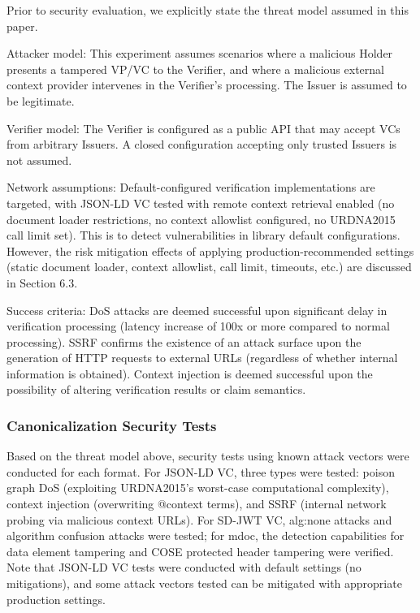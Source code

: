 \documentclass[conference]{IEEEtran}
\begin{document}
Prior to security evaluation, we explicitly state the threat model assumed in this paper.

Attacker model: This experiment assumes scenarios where a malicious Holder presents a tampered VP/VC to the Verifier, and where a malicious external context provider intervenes in the Verifier's processing. The Issuer is assumed to be legitimate.

Verifier model: The Verifier is configured as a public API that may accept VCs from arbitrary Issuers. A closed configuration accepting only trusted Issuers is not assumed.

Network assumptions: Default-configured verification implementations are targeted, with JSON-LD VC tested with remote context retrieval enabled (no document loader restrictions, no context allowlist configured, no URDNA2015 call limit set). This is to detect vulnerabilities in library default configurations. However, the risk mitigation effects of applying production-recommended settings (static document loader, context allowlist, call limit, timeouts, etc.) are discussed in Section 6.3.

Success criteria: DoS attacks are deemed successful upon significant delay in verification processing (latency increase of 100x or more compared to normal processing). SSRF confirms the existence of an attack surface upon the generation of HTTP requests to external URLs (regardless of whether internal information is obtained). Context injection is deemed successful upon the possibility of altering verification results or claim semantics.

\subsubsection{Canonicalization Security Tests}

Based on the threat model above, security tests using known attack vectors were conducted for each format. For JSON-LD VC, three types were tested: poison graph DoS (exploiting URDNA2015's worst-case computational complexity), context injection (overwriting @context terms), and SSRF (internal network probing via malicious context URLs). For SD-JWT VC, alg:none attacks \cite{ref8} and algorithm confusion attacks were tested; for mdoc, the detection capabilities for data element tampering and COSE protected header tampering were verified. Note that JSON-LD VC tests were conducted with default settings (no mitigations), and some attack vectors tested can be mitigated with appropriate production settings.
\end{document}
